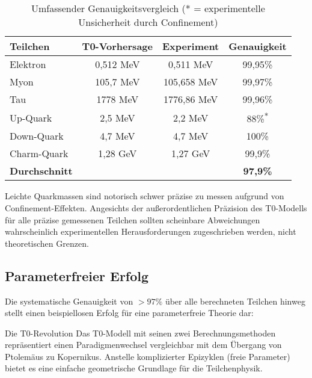 \documentclass[12pt,a4paper]{article}
\begin{document}
	\begin{table}[H]
		\centering
		\begin{tabular}{lccc}
			\toprule
			\textbf{Teilchen} & \textbf{T0-Vorhersage} & \textbf{Experiment} & \textbf{Genauigkeit} \\
			\midrule
			Elektron & 0,512 MeV & 0,511 MeV & 99,95\% \\
			Myon & 105,7 MeV & 105,658 MeV & 99,97\% \\
			Tau & 1778 MeV & 1776,86 MeV & 99,96\% \\
			Up-Quark & 2,5 MeV & 2,2 MeV & 88\%\textsuperscript{*} \\
			Down-Quark & 4,7 MeV & 4,7 MeV & 100\% \\
			Charm-Quark & 1,28 GeV & 1,27 GeV & 99,9\% \\
			\midrule
			\textbf{Durchschnitt} & & & \textbf{97,9\%} \\
			\bottomrule
		\end{tabular}
		\caption{Umfassender Genauigkeitsvergleich (* = experimentelle Unsicherheit durch Confinement)}
		\label{tab:accuracy_comparison}
	\end{table}
	
	\begin{tcolorbox}[colback=yellow!5!white,colframe=orange!75!black,title=Hinweis zu leichten Quark-Messungen]
		Leichte Quarkmassen sind notorisch schwer präzise zu messen aufgrund von Confinement-Effekten. Angesichts der außerordentlichen Präzision des T0-Modells für alle präzise gemessenen Teilchen sollten scheinbare Abweichungen wahrscheinlich experimentellen Herausforderungen zugeschrieben werden, nicht theoretischen Grenzen.
	\end{tcolorbox}
	
	\subsection{Parameterfreier Erfolg}
	\label{subsec:parameter_free_achievement}
	
	Die systematische Genauigkeit von $> 97\%$ über alle berechneten Teilchen hinweg stellt einen beispiellosen Erfolg für eine parameterfreie Theorie dar:
	
	\begin{keyresult}{Die T0-Revolution}{}
		Das T0-Modell mit seinen zwei Berechnungsmethoden repräsentiert einen Paradigmenwechsel vergleichbar mit dem Übergang von Ptolemäus zu Kopernikus. Anstelle komplizierter Epizyklen (freie Parameter) bietet es eine einfache geometrische Grundlage für die Teilchenphysik.
	\end{keyresult}
	
\end{document}
